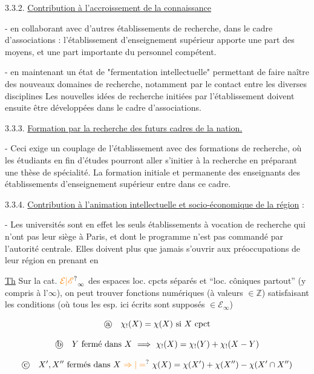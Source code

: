 3.3.2. \uline{Contribution à l'accroissement de la connaissance}

- en collaborant avec d'autres établissements de recherche, dans le cadre d'associations : l'établissement d'enseignement supérieur apporte une part des moyens, et une part importante du personnel compétent.

- en maintenant un état de "fermentation intellectuelle" permettant de faire naître des nouveaux domaines de recherche, notamment par le contact entre les diverses disciplines Les nouvelles idées de recherche\handwritten{,} initiées par l'établissement\handwritten{,} doivent\deleted{\unsure{,}} ensuite être développées dans le cadre d'associations.

3.3.3. \uline{Formation par la recherche des futurs cadres de la nation.}

- Ceci exige un couplage de l'établissement avec des formations de recherche, où les étudiants en fin d'études pourront aller s'initier à la recherche en préparant une thèse de spécialité. La formation initiale et permanente des enseignants des établissements d'enseignement supérieur entre dans ce cadre. \unsure{-}

3.3.4. \uline{Contribution à l'animation intellectuelle et socio-économique de la région} :

\margin{\unsure{-}}

- Les universités sont en effet les seuls établissements à vocation de recherche qui n'ont pas leur siège à Paris, et dont le programme n'est pas commandé par l'autorité centrale. Elles doivent plus que jamais s'ouvrir aux préoccupations de leur région en prenant en


\uline{Th} Sur la cat. $\unsure{\mathcal E|\mathscr E}_\infty$ des espaces loc. cpcts séparés et  ``loc. côniques partout'' (y compris à l'$\infty$), on peut trouver  fonctions numériques \inserted{$\chi_!,\chi$} (à valeurs $\in\mathbb Z$) satisfaisant les conditions (où tous les esp. ici écrits sont supposés $\in\mathcal E_\infty$)

\[
\text{\textcircled{a}}\quad\chi_!(X)=\chi(X)\text{ si }X\text{ cpct}
\]

\[
\text{\textcircled{b}}\quad Y\text{ fermé dans }X\ \Longrightarrow\ \chi_!(X)=\chi_!(Y)+\chi_!(X-Y)
\]

\[
\text{\textcircled{c}}\quad X',X''\text{ fermés dans }X\ \unsure{\Rightarrow|=}\ \chi(X)=\chi(X')+\chi(X'')-\chi(X'\cap X'')
\]

